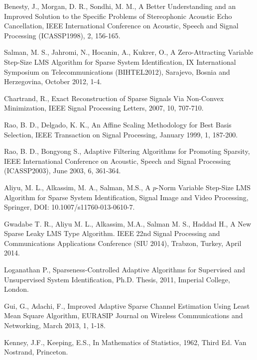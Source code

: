 Benesty, J., Morgan, D. R., Sondhi, M. M., A Better Understanding and an Improved Solution to the Speciﬁc Problems of Stereophonic Acoustic Echo
 Cancellation, IEEE International Conference on  Acoustic, Speech and Signal Processing (ICASSP1998), 2, 156-165.


Salman, M. S., Jahromi, N., Hocanin, A., Kukrer, O., A Zero-Attracting Variable Step-Size LMS Algorithm for Sparse System Identification, IX International Symposium on Telecommunications (BIHTEL2012), Sarajevo, Bosnia and Herzegovina, October 2012, 1-4.

Chartrand, R., Exact Reconstruction of Sparse Signals Via Non-Convex Minimization, IEEE Signal Processing Letters, 2007, 10, 707-710.

Rao, B. D., Delgado, K. K., An Affine Scaling Methodology for Best Basis Selection, IEEE Transaction on Signal Processing, January 1999, 1, 187-200.


%
Rao, B. D., Bongyong S., Adaptive Filtering Algorithms for Promoting Sparsity, IEEE International Conference on  Acoustic, Speech and Signal Processing (ICASSP2003), June 2003, 6, 361-364.

Aliyu, M. L., Alkassim, M. A., Salman, M.S., A $p$-Norm Variable Step-Size LMS Algorithm for Sparse System Identification, Signal Image and Video Processing, Springer, DOI: 10.1007/s11760-013-0610-7.

Gwadabe T. R., Aliyu M. L., Alkassim, M.A., Salman M. S., Haddad H., A New Sparse Leaky LMS Type Algorithm. IEEE 22nd Signal Processing and Communications Applications Conference (SIU 2014), Trabzon, Turkey, April 2014.

Loganathan P., Sparseness-Controlled Adaptive Algorithms for Supervised and Unsupervised System Identification, Ph.D. Thesis, 2011, Imperial College, London.




Gui, G., Adachi, F., Improved Adaptive Sparse Channel Estimation Using Least Mean Square Algorithm, EURASIP Journal on Wireless Communications and Networking, March 2013, 1, 1-18.


Kenney, J.F., Keeping, E.S., In Mathematics of Statistics, 1962, Third Ed. Van Nostrand, Princeton.


